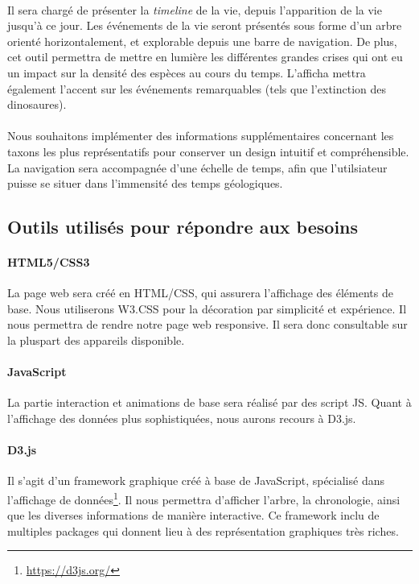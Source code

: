 \documentclass[a4paper]{article}
\begin{document}
		\paragraph{}
		Il sera chargé de présenter la \emph{timeline} de la vie, depuis l'apparition de la vie jusqu'à ce jour. Les événements de la vie seront présentés sous forme d'un arbre orienté horizontalement, et explorable depuis une barre de navigation.	De plus, cet outil permettra de mettre en lumière les différentes grandes crises qui ont eu un impact sur la densité des espèces au cours du temps. L'afficha mettra également l'accent sur les événements remarquables (tels que l'extinction des dinosaures). 
		
		\paragraph{}
		Nous souhaitons implémenter des informations supplémentaires concernant les taxons les plus représentatifs pour conserver un design intuitif et compréhensible.
		La navigation sera accompagnée d'une échelle de temps, afin que l'utilsiateur puisse se situer dans l'immensité des temps géologiques.
				

	\subsection{Outils utilisés pour répondre aux besoins}
		\paragraph{HTML5/CSS3}
		La page web sera créé en HTML/CSS, qui assurera l'affichage des éléments de base.
		Nous utiliserons W3.CSS pour la décoration par simplicité et expérience. Il nous permettra de rendre notre page web responsive. Il sera donc consultable sur la pluspart des appareils disponible.

		\paragraph{JavaScript}
		La partie interaction et animations de base sera réalisé par des script JS. Quant à l'affichage des données plus sophistiquées, nous aurons recours à D3.js.

		\paragraph{D3.js}
		Il s'agit d'un framework graphique créé à base de JavaScript, spécialisé dans l'affichage de données\footnote{\url{https://d3js.org/}}. Il nous permettra d'afficher l'arbre, la chronologie, ainsi que les diverses informations de manière interactive. 
		Ce framework inclu de multiples packages qui donnent lieu à des représentation graphiques très riches. 
\end{document}
